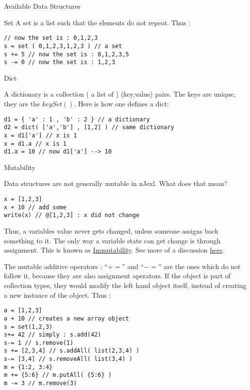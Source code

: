 \begin{section}{Available Data Structures}
\begin{subsection}{Set}
A set is a list such that the elements do not repeat.
Thus :

\begin{lstlisting}[style=JexlStyle]
// now the set is : 0,1,2,3
s = set ( 0,1,2,3,1,2,3 ) // a set  
s += 5 // now the set is : 0,1,2,3,5 
s -= 0 // now the set is : 1,2,3
\end{lstlisting}
\end{subsection}

\begin{subsection}{Dict}

A dictionary is a collection ( a list of ) (key,value) pairs.
The keys are unique, they are the $keySet()$. Here is how one defines a dict:

\begin{lstlisting}[style=JexlStyle]
d1 = { 'a' : 1 , 'b' : 2 } // a dictionary   
d2 = dict( ['a','b'] , [1,2] ) // same dictionary  
x = d1['a'] // x is 1
x = d1.a // x is 1 
d1.a = 10 // now d1['a'] --> 10 
\end{lstlisting}
\end{subsection}

\begin{subsection}{Mutability}

Data structures are not generally mutable in nJexl.
What does that mean?
\begin{lstlisting}[style=JexlStyle]
x = [1,2,3]
x + 10 // add some 
write(x) // @[1,2,3] : x did not change
\end{lstlisting}
Thus, a variables value never gets changed, unless someone assigns
back something to it. The only way a variable state can get 
change is through assignment. This is known as \href{https://en.wikipedia.org/wiki/Immutable_object}{Immutability}.
See more of a discussion \href{http://programmers.stackexchange.com/questions/151733/if-immutable-objects-are-good-why-do-people-keep-creating-mutable-objects}{here}.

The mutable additive operators : ``$+=$'' and ``$-=$'' are the ones which do not follow it, because
they are also assignment operators. If the object is part of collection types, they would modify the left hand object itself, 
instead of creating a new instance of the object. Thus :

\begin{lstlisting}[style=JexlStyle]
a = [1,2,3]
a + 10 // creates a new array object  
s = set(1,2,3)
s+= 42 // simply : s.add(42)
s-= 1 // s.remove(1)
s += [2,3,4] // s.addAll( list(2,3,4) )
s-= [3,4] // s.removeAll( list(3,4) )
m = {1:2, 3:4}
m += {5:6} // m.putAll( {5:6} )
m -= 3 // m.remove(3)
\end{lstlisting}

\end{subsection}

\end{section}


